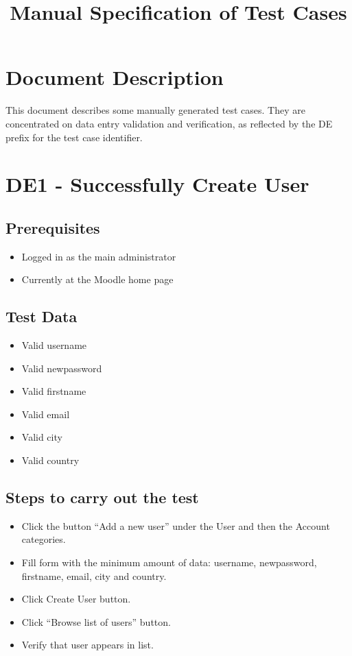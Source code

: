 \documentclass{article}
\title{Manual Specification of Test Cases}
\begin{document}
\maketitle


\section{Document Description}

This document describes some manually generated test cases.
They are concentrated on data entry validation and verification,
as reflected by the DE prefix for the test case identifier.

\section*{DE1 - Successfully Create User}

\subsection*{Prerequisites}

\begin{itemize}
  \item Logged in as the main administrator
  \item Currently at the Moodle home page
\end{itemize}

\subsection*{Test Data}

\begin{itemize}
  \item Valid username
  \item Valid newpassword
  \item Valid firstname
  \item Valid email
  \item Valid city
  \item Valid country
\end{itemize}

\subsection*{Steps to carry out the test}

\begin{itemize}
  \item Click the button ``Add a new user'' under the User and then
    the Account categories.
  \item Fill form with the minimum amount of data: username, newpassword,
    firstname, email, city and country.
  \item Click Create User button.
  \item Click ``Browse list of users'' button.
  \item Verify that user appears in list.
\end{itemize}
\end{document}
